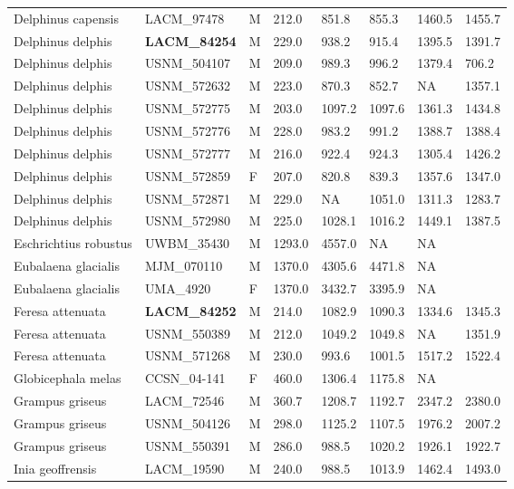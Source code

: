 \begin{longtable}{|p{1.95in}p{1.1in}p{.15in}p{.4in}p{.4in}p{.4in}p{.4in}p{.4in}|}
  Delphinus capensis & LACM\_97478 & M & 212.0 & 851.8 & 855.3 & 1460.5 & 1455.7 \\ 
  Delphinus delphis & \textbf{ LACM\_84254 } & M & 229.0 & 938.2 & 915.4 & 1395.5 & 1391.7 \\ 
  Delphinus delphis & USNM\_504107 & M & 209.0 & 989.3 & 996.2 & 1379.4 & 706.2 \\ 
  Delphinus delphis & USNM\_572632 & M & 223.0 & 870.3 & 852.7 & NA & 1357.1 \\ 
  Delphinus delphis & USNM\_572775 & M & 203.0 & 1097.2 & 1097.6 & 1361.3 & 1434.8 \\ 
  Delphinus delphis & USNM\_572776 & M & 228.0 & 983.2 & 991.2 & 1388.7 & 1388.4 \\ 
  Delphinus delphis & USNM\_572777 & M & 216.0 & 922.4 & 924.3 & 1305.4 & 1426.2 \\ 
  Delphinus delphis & USNM\_572859 & F & 207.0 & 820.8 & 839.3 & 1357.6 & 1347.0 \\ 
  Delphinus delphis & USNM\_572871 & M & 229.0 & NA & 1051.0 & 1311.3 & 1283.7 \\ 
  Delphinus delphis & USNM\_572980 & M & 225.0 & 1028.1 & 1016.2 & 1449.1 & 1387.5 \\ 
  Eschrichtius robustus & UWBM\_35430 & M & 1293.0 & 4557.0 & NA & NA &  \\ 
  Eubalaena glacialis & MJM\_070110 & M & 1370.0 & 4305.6 & 4471.8 & NA &  \\ 
  Eubalaena glacialis & UMA\_4920 & F & 1370.0 & 3432.7 & 3395.9 & NA &  \\ 
  Feresa attenuata & \textbf{ LACM\_84252 } & M & 214.0 & 1082.9 & 1090.3 & 1334.6 & 1345.3 \\ 
  Feresa attenuata & USNM\_550389 & M & 212.0 & 1049.2 & 1049.8 & NA & 1351.9 \\ 
  Feresa attenuata & USNM\_571268 & M & 230.0 & 993.6 & 1001.5 & 1517.2 & 1522.4 \\ 
  Globicephala melas & CCSN\_04-141 & F & 460.0 & 1306.4 & 1175.8 & NA &  \\ 
  Grampus griseus & LACM\_72546 & M & 360.7 & 1208.7 & 1192.7 & 2347.2 & 2380.0 \\ 
  Grampus griseus & USNM\_504126 & M & 298.0 & 1125.2 & 1107.5 & 1976.2 & 2007.2 \\ 
  Grampus griseus & USNM\_550391 & M & 286.0 & 988.5 & 1020.2 & 1926.1 & 1922.7 \\ 
  Inia geoffrensis & LACM\_19590 & M & 240.0 & 988.5 & 1013.9 & 1462.4 & 1493.0 \\ 

\end{longtable}
